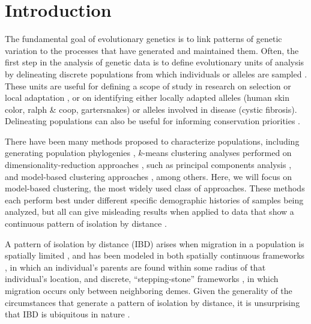 \documentclass[12pt]{article}
\begin{document}


\newpage
\section*{Introduction}
The fundamental goal of evolutionary genetics is to link patterns of genetic variation 
to the processes that have generated and maintained them.
Often, the first step in the analysis of genetic data is to define evolutionary units of analysis
by delineating discrete populations from which individuals or alleles are sampled \citep{wright1949genetical}.
These units are useful for defining a scope of study in research on selection or local adaptation \citep{},
or on identifying either locally adapted alleles (human skin color, ralph \& coop, gartersnakes) or alleles involved in disease (cystic fibrosis).
Delineating populations can also be useful for informing conservation priorities \citep{}.

There have been many methods proposed to characterize populations,
including generating population phylogenies \citep{CavalliSforza1975, treemix},
$k$-means clustering analyses performed on dimensionality-reduction approaches \citep{}, 
such as principal components analysis \citep{menozzi1978synthetic,novembre_interpreting_2008, price2006eigenstrat},
and model-based clustering approaches \citep[e.g.][]{STRUCTURE, falush2003, hubisz2009,ADMIXTURE, FINESTRUCTURE, huelsenbeck2007inference, Corander2003}, among others.
Here, we will focus on model-based clustering, the most widely used class of approaches.
These methods each perform best under different specific demographic histories of samples being analyzed,
but all can give misleading results when applied to data that show a continuous pattern of isolation by distance \citep{Wright 1938, 1940, Wright1943}.

A pattern of isolation by distance (IBD) arises when migration in a population is spatially limited \citep{Slatkin1985},
and has been modeled in both spatially continuous frameworks \citep{Wright1943,Malecot1948}, 
in which an individual's parents are found within some radius of that individual's location,
and discrete, ``stepping-stone'' frameworks \citep{Kimura1953},
in which migration occurs only between neighboring demes.
Given the generality of the circumstances that generate a pattern of isolation by distance, 
it is unsurprising that IBD is ubiquitous in nature \citep{meirmans2012,Sexton_etal_2014}.
\end{document}
